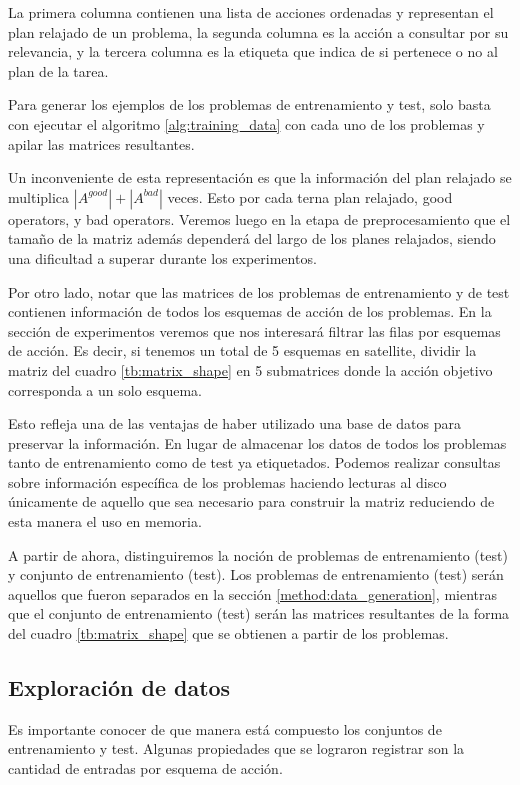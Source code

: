 La primera columna contienen una lista de acciones ordenadas y representan el plan relajado de un problema, la segunda columna es la acción a consultar por su relevancia, y la tercera columna es la etiqueta que indica de si pertenece o no al plan de la tarea.

Para generar los ejemplos de los problemas de entrenamiento y test, solo basta con ejecutar el algoritmo \ref{alg:training_data} con cada uno de los problemas y apilar las matrices resultantes.

Un inconveniente de esta representación es que la información del plan relajado se multiplica $|A^{good}| + |A^{bad}|$ veces. Esto por cada terna plan relajado, good operators, y bad operators.
Veremos luego en la etapa de preprocesamiento que el tamaño de la matriz además dependerá del largo de los planes relajados, siendo una dificultad a superar durante los experimentos.

Por otro lado, notar que las matrices de los problemas de entrenamiento y de test contienen información de todos los esquemas de acción de los problemas. En la sección de experimentos veremos que nos interesará filtrar las filas por esquemas de acción. Es decir, si tenemos un total de 5 esquemas en satellite, dividir la matriz del cuadro \ref{tb:matrix_shape} en 5 submatrices donde la acción objetivo corresponda a un solo esquema.

Esto refleja una de las ventajas de haber utilizado una base de datos para preservar la información. En lugar de almacenar los datos de todos los problemas tanto de entrenamiento como de test ya etiquetados. Podemos realizar consultas sobre información específica de los problemas haciendo lecturas al disco únicamente de aquello que sea necesario para construir la matriz reduciendo de esta manera el uso en memoria.

A partir de ahora, distinguiremos la noción de problemas de entrenamiento (test) y conjunto de entrenamiento (test). Los problemas de entrenamiento (test) serán aquellos que fueron separados en la sección \ref{method:data_generation}, mientras que el conjunto de entrenamiento (test) serán las matrices resultantes de la forma del cuadro \ref{tb:matrix_shape} que se obtienen a partir de los problemas.

\subsection{Exploración de datos}

Es importante conocer de que manera está compuesto los conjuntos de entrenamiento y test. Algunas propiedades que se lograron registrar son la cantidad de entradas por esquema de acción.

